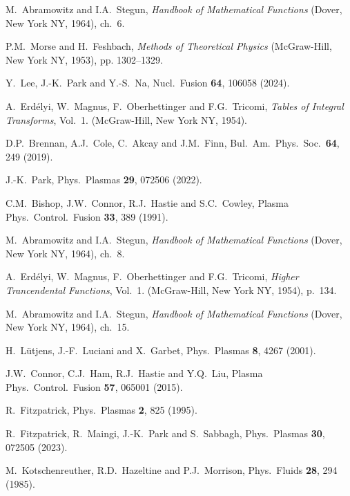 \documentclass[12pt,prb,aps]{revtex4-1}
\begin{document}
\begin{thebibliography}{99}
 M.~Abramowitz and I.A.~Stegun, {\em Handbook of Mathematical Functions}\/ (Dover, New York NY, 1964), ch.~6.

 P.M.~Morse and H.~Feshbach, {\em Methods of Theoretical Physics}\/ (McGraw-Hill, New York NY, 1953), pp. 1302–1329.

 Y.~Lee, J.-K.~Park and Y.-S.~Na, Nucl.\ Fusion {\bf 64}, 106058 (2024). 

 A.~Erd\'{e}lyi, W.~Magnus, F.~Oberhettinger and F.G.~Tricomi, {\em Tables of Integral Transforms}, Vol.~1. (McGraw-Hill, New York NY, 1954).

 D.P.~Brennan, A.J.~Cole, C.~Akcay and J.M.~Finn, Bul.\ Am.\ Phys.\ Soc.\ {\bf 64}, 249 (2019).

 J.-K.~Park, Phys.\ Plasmas {\bf 29}, 072506 (2022).

 C.M.~Bishop, J.W.~Connor, R.J.~Hastie and S.C.~Cowley, Plasma Phys.\ Control.\ Fusion {\bf 33}, 389 (1991). 

 M.~Abramowitz and I.A.~Stegun, {\em Handbook of Mathematical Functions}\/ (Dover, New York NY, 1964), ch.~8.

 A.~Erd\'{e}lyi, W.~Magnus, F.~Oberhettinger and F.G.~Tricomi, {\em Higher Trancendental Functions}, Vol.~1. (McGraw-Hill, New York NY, 1954), p.~134.

 M.~Abramowitz and I.A.~Stegun, {\em Handbook of Mathematical Functions}\/ (Dover, New York NY, 1964), ch.~15.

 H.~L\"{u}tjens, J.-F.~Luciani and X.~Garbet, Phys.\ Plasmas {\bf 8}, 4267 (2001).

 J.W.~Connor, C.J.~Ham, R.J.~Hastie and Y.Q.~Liu, Plasma Phys.\ Control.\ Fusion {\bf 57}, 065001 (2015). 

 R.~Fitzpatrick, Phys.\ Plasmas {\bf 2}, 825 (1995).

 R.~Fitzpatrick, R.~Maingi, J.-K.~Park and S.~Sabbagh, Phys.\ Plasmas {\bf 30}, 072505 (2023).

 M.~Kotschenreuther, R.D.~Hazeltine and P.J.~Morrison, Phys.\ Fluids {\bf 28}, 294 (1985). 

\end{thebibliography}
\end{document}
